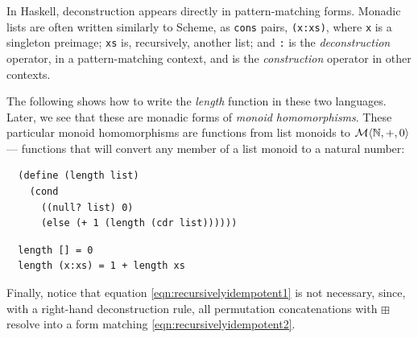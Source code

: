 In Haskell, deconstruction appears directly in pattern-matching forms. Monadic lists are often written similarly to Scheme, as \verb"cons" pairs, \verb"(x:xs)", where \verb"x" is a singleton preimage; \verb"xs" is, recursively, another list; and \verb":" is the \emph{deconstruction} operator, in a pattern-matching context, and is the \emph{construction} operator in other contexts.


The following shows how to write the \emph{length} function in these two languages. Later, we see that these are monadic forms of \emph{monoid homomorphisms}. These particular monoid homomorphisms are functions from list monoids to $\mathcal{M}\langle{\mathbb{N}},{+},{0}\rangle$ --- functions that will convert any member of a list monoid to a natural number:

\newpage

\begin{verbatim}
  (define (length list)
    (cond
      ((null? list) 0)
      (else (+ 1 (length (cdr list))))))
\end{verbatim}
\begin{verbatim}
  length [] = 0
  length (x:xs) = 1 + length xs
\end{verbatim}


Finally, notice that equation \ref{eqn:recursivelyidempotent1} is not necessary, since, with a right-hand deconstruction rule, all permutation concatenations with $\boxplus$ resolve into a form matching \ref{eqn:recursivelyidempotent2}.


